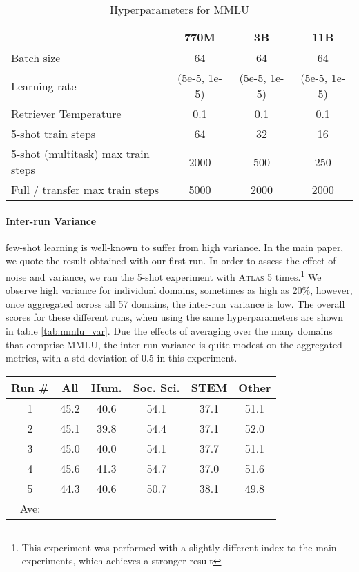 \documentclass[10pt]{article} \usepackage[preprint]{tmlr}
\newcommand{\Atlas}{\textsc{Atlas}}
\begin{document}
\begin{table}[t]
  \centering
  \caption{Hyperparameters for MMLU}
  \label{tab:mmlu_hps}
  \vspace{0.5em}
  \begin{tabular}{l ccc}
    \toprule
& 770M &  3B  & 11B  \\
\midrule
Batch size & 64 & 64 & 64\\
Learning rate & (5e-5, 1e-5)&(5e-5, 1e-5)&(5e-5, 1e-5) \\
Retriever Temperature & 0.1 & 0.1 & 0.1  \\
5-shot train steps & 64 & 32 & 16\\
5-shot (multitask) max train steps & 2000 & 500 & 250 \\
Full / transfer max train steps & 5000 & 2000 & 2000\\
    \bottomrule
  \end{tabular}
\end{table}


\paragraph{Inter-run Variance} few-shot learning is well-known to suffer from high variance.
In the main paper, we quote the result obtained with our first run.
In order to  assess the effect of noise and variance, we ran the 5-shot experiment with \Atlas{} 5 times.\footnote{This experiment was performed with a slightly different index to the main experiments, which achieves a stronger result}
We observe high variance for individual domains, sometimes as high as 20\%, however, once aggregated across all 57 domains, the inter-run variance is low.
The overall scores for these different runs, when using the same hyperparameters are shown in table \ref{tab:mmlu_var}. Due the effects of averaging over the many domains that comprise MMLU, the inter-run variance is quite modest on the aggregated metrics, with a std deviation of 0.5 in this experiment.


\begin{table*}
    \caption{
    Interrun Variance for 5-shot MMLU using \Atlas{}-11B}
    \label{tab:mmlu_var}
    \vspace{0.5em}
    \centering
 \begin{tabular}{c ccccc}
    \toprule
Run \#  & All  & Hum. & Soc. Sci. & STEM & Other \\
    \midrule
1 & 45.2&	40.6&	54.1&	37.1&	51.1\\
2 & 45.1&	39.8&	54.4&	37.1&	52.0\\
3 & 45.0&	40.0&	54.1&	37.7&	51.1\\
4 & 45.6&	41.3&	54.7&	37.0&	51.6\\
5 & 44.3&	40.6&	50.7&	38.1&	49.8\\
\midrule
Ave: &  & & &	 &	\\
    \bottomrule
  \end{tabular}
\end{table*}
\end{document}
